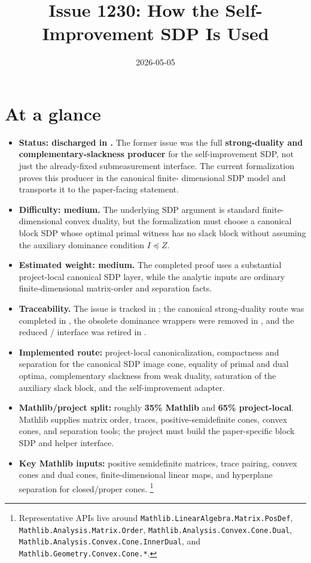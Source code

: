 \documentclass[11pt]{article}
\title{Issue 1230: How the Self-Improvement SDP Is Used}
\author{}
\date{2026-05-05}
\begin{document}
\maketitle

\section{At a glance}

\begin{itemize}
  \item \textbf{Status: discharged in .}  The former issue was the full
  \textbf{strong-duality and complementary-slackness producer} for the
  self-improvement SDP, not just the already-fixed submeasurement interface.
  The current formalization proves this producer in the canonical finite-
  dimensional SDP model and transports it to the paper-facing statement.
  \item \textbf{Difficulty: medium.}  The underlying SDP argument is standard
  finite-dimensional convex duality, but the formalization must choose a
  canonical block SDP whose optimal primal witness has no slack block without
  assuming the auxiliary dominance condition $I\preceq Z$.
  \item \textbf{Estimated weight: medium.}  The completed proof uses a
  substantial project-local canonical SDP layer, while the analytic inputs are
  ordinary finite-dimensional matrix-order and separation facts.
  \item \textbf{Traceability.}  The issue is tracked in ; the
  canonical strong-duality route was completed in , the obsolete
  dominance wrappers were removed in , and the reduced
  / interface was retired in .
  \item \textbf{Implemented route:} project-local canonicalization, compactness
  and separation for the canonical SDP image cone, equality of primal and dual
  optima, complementary slackness from weak duality, saturation of the auxiliary
  slack block, and the self-improvement adapter.
  \item \textbf{Mathlib/project split:} roughly \textbf{35\% Mathlib} and
  \textbf{65\% project-local}.  Mathlib supplies matrix order, traces,
  positive-semidefinite cones, convex cones, and separation tools; the project
  must build the paper-specific block SDP and helper interface.
  \item \textbf{Key Mathlib inputs:} positive semidefinite matrices, trace pairing,
  convex cones and dual cones, finite-dimensional linear maps, and hyperplane
  separation for closed/proper cones.%
  \footnote{Representative APIs live around
  \texttt{Mathlib.LinearAlgebra.Matrix.PosDef},
  \texttt{Mathlib.Analysis.Matrix.Order},
  \texttt{Mathlib.Analysis.Convex.Cone.Dual},
  \texttt{Mathlib.Analysis.Convex.Cone.InnerDual}, and
  \texttt{Mathlib.Geometry.Convex.Cone.*}.}
\end{itemize}
\end{document}
